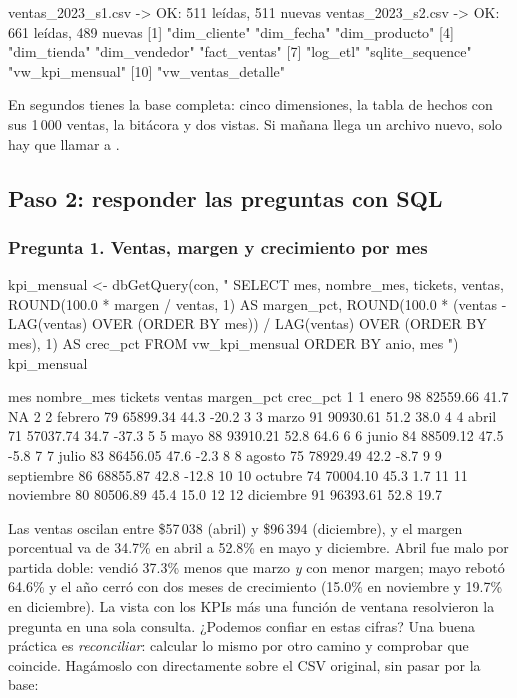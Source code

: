 \begin{rsalida}
ventas_2023_s1.csv -> OK: 511 leídas, 511 nuevas 
ventas_2023_s2.csv -> OK: 661 leídas, 489 nuevas 
 [1] "dim_cliente"       "dim_fecha"         "dim_producto"     
 [4] "dim_tienda"        "dim_vendedor"      "fact_ventas"      
 [7] "log_etl"           "sqlite_sequence"   "vw_kpi_mensual"   
[10] "vw_ventas_detalle"
\end{rsalida}

En segundos tienes la base completa: cinco dimensiones, la tabla de hechos
con sus 1\,000 ventas, la bitácora y dos vistas. Si mañana llega un archivo
nuevo, solo hay que llamar a .

\subsection{Paso 2: responder las preguntas con SQL}

\subsubsection{Pregunta 1. Ventas, margen y crecimiento por mes}

\begin{rcode}
kpi_mensual <- dbGetQuery(con, "
  SELECT mes, nombre_mes, tickets, ventas,
         ROUND(100.0 * margen / ventas, 1) AS margen_pct,
         ROUND(100.0 * (ventas - LAG(ventas) OVER (ORDER BY mes)) /
               LAG(ventas) OVER (ORDER BY mes), 1) AS crec_pct
  FROM vw_kpi_mensual
  ORDER BY anio, mes
")
kpi_mensual
\end{rcode}

\begin{rsalida}
   mes nombre_mes tickets   ventas margen_pct crec_pct
1    1      enero      98 82559.66       41.7       NA
2    2    febrero      79 65899.34       44.3    -20.2
3    3      marzo      91 90930.61       51.2     38.0
4    4      abril      71 57037.74       34.7    -37.3
5    5       mayo      88 93910.21       52.8     64.6
6    6      junio      84 88509.12       47.5     -5.8
7    7      julio      83 86456.05       47.6     -2.3
8    8     agosto      75 78929.49       42.2     -8.7
9    9 septiembre      86 68855.87       42.8    -12.8
10  10    octubre      74 70004.10       45.3      1.7
11  11  noviembre      80 80506.89       45.4     15.0
12  12  diciembre      91 96393.61       52.8     19.7
\end{rsalida}

Las ventas oscilan entre \$57\,038 (abril) y \$96\,394 (diciembre), y el
margen porcentual va de 34.7\% en abril a 52.8\% en mayo y diciembre. Abril
fue malo por partida doble: vendió 37.3\% menos que marzo \emph{y} con menor
margen; mayo rebotó 64.6\% y el año cerró con dos meses de crecimiento
(15.0\% en noviembre y 19.7\% en diciembre). La vista con los KPIs más una
función de ventana resolvieron la pregunta en una sola consulta. ¿Podemos confiar en estas cifras? Una buena práctica es
\emph{reconciliar}: calcular lo mismo por otro camino y comprobar que
coincide. Hagámoslo con  directamente sobre el CSV original,
sin pasar por la base:

